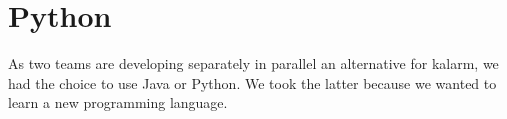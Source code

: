 \section{Python}
As two teams are developing separately in parallel an
alternative for \gls{kalarm}, we had the choice to use Java or Python. We took
the latter because we wanted to learn a new programming language.

